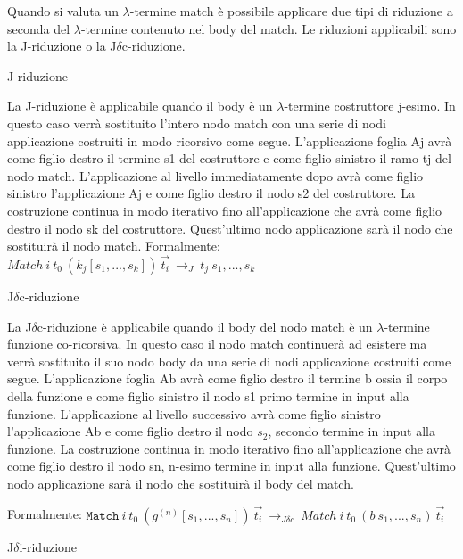 \documentclass[12pt,a4paper,openright,twoside]{report}
\newcommand\match{\mathtt{Match}}
\begin{document}
Quando si valuta un $\lambda$-termine match \`e possibile applicare due tipi di riduzione a seconda del $\lambda$-termine contenuto nel body del match. Le riduzioni applicabili sono la J-riduzione o la J$\delta$c-riduzione.\newline

J-riduzione

La J-riduzione \`e applicabile quando il body \`e un $\lambda$-termine costruttore j-esimo. In questo caso verr\`a sostituito l'intero nodo match con una serie di nodi applicazione costruiti in modo ricorsivo come segue. L'applicazione foglia Aj avr\`a come figlio destro il termine s1 del costruttore e come figlio sinistro il ramo tj del nodo match. L'applicazione al livello immediatamente dopo avr\`a come figlio sinistro l'applicazione Aj e come figlio destro il nodo s2 del costruttore. La costruzione continua in modo iterativo fino all'applicazione che avr\`a come figlio destro il nodo sk del costruttore. Quest'ultimo nodo applicazione sar\`a il nodo che sostituir\`a il nodo match.\newline
Formalmente: $Match\> i\> t_0\> (k_j [s_1, ..., s_k])\> \Vec{t_{i}}\> \rightarrow_J \> t_j\> s_1, ..., s_k$\newline

J$\delta$c-riduzione

La J$\delta$c-riduzione \`e applicabile quando il body del nodo match \`e un $\lambda$-termine funzione co-ricorsiva. In questo caso il nodo match continuer\`a ad esistere ma verr\`a sostituito il suo nodo body da una serie di nodi applicazione costruiti come segue. L'applicazione foglia Ab avr\`a come figlio destro il termine b ossia il corpo della funzione e come figlio sinistro il nodo s1 primo termine in input alla funzione. L'applicazione al livello successivo avr\`a come figlio sinistro l'applicazione Ab e come figlio destro il nodo $s_2$, secondo termine in input alla funzione. La costruzione continua in modo iterativo fino all'applicazione che avr\`a come figlio destro il nodo sn, n-esimo termine in input alla funzione. Quest'ultimo nodo applicazione sar\`a il nodo che sostituir\`a il body del match.\newline

Formalmente: $\match\> i\> t_0\> (g^{(n)} [s_1, ..., s_n])\> \Vec{t_{i}}\> \rightarrow_{J\delta c} \>Match\> i\> t_0\> (b\> s_1, ..., s_n)\> \Vec{t_{i}}$\newline
\newline

J$\delta$i-riduzione
\end{document}
